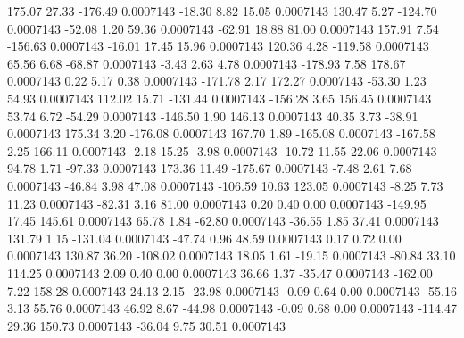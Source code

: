       175.07       27.33     -176.49     0.0007143
      -18.30        8.82       15.05     0.0007143
      130.47        5.27     -124.70     0.0007143
      -52.08        1.20       59.36     0.0007143
      -62.91       18.88       81.00     0.0007143
      157.91        7.54     -156.63     0.0007143
      -16.01       17.45       15.96     0.0007143
      120.36        4.28     -119.58     0.0007143
       65.56        6.68      -68.87     0.0007143
       -3.43        2.63        4.78     0.0007143
     -178.93        7.58      178.67     0.0007143
        0.22        5.17        0.38     0.0007143
     -171.78        2.17      172.27     0.0007143
      -53.30        1.23       54.93     0.0007143
      112.02       15.71     -131.44     0.0007143
     -156.28        3.65      156.45     0.0007143
       53.74        6.72      -54.29     0.0007143
     -146.50        1.90      146.13     0.0007143
       40.35        3.73      -38.91     0.0007143
      175.34        3.20     -176.08     0.0007143
      167.70        1.89     -165.08     0.0007143
     -167.58        2.25      166.11     0.0007143
       -2.18       15.25       -3.98     0.0007143
      -10.72       11.55       22.06     0.0007143
       94.78        1.71      -97.33     0.0007143
      173.36       11.49     -175.67     0.0007143
       -7.48        2.61        7.68     0.0007143
      -46.84        3.98       47.08     0.0007143
     -106.59       10.63      123.05     0.0007143
       -8.25        7.73       11.23     0.0007143
      -82.31        3.16       81.00     0.0007143
        0.20        0.40        0.00     0.0007143
     -149.95       17.45      145.61     0.0007143
       65.78        1.84      -62.80     0.0007143
      -36.55        1.85       37.41     0.0007143
      131.79        1.15     -131.04     0.0007143
      -47.74        0.96       48.59     0.0007143
        0.17        0.72        0.00     0.0007143
      130.87       36.20     -108.02     0.0007143
       18.05        1.61      -19.15     0.0007143
      -80.84       33.10      114.25     0.0007143
        2.09        0.40        0.00     0.0007143
       36.66        1.37      -35.47     0.0007143
     -162.00        7.22      158.28     0.0007143
       24.13        2.15      -23.98     0.0007143
       -0.09        0.64        0.00     0.0007143
      -55.16        3.13       55.76     0.0007143
       46.92        8.67      -44.98     0.0007143
       -0.09        0.68        0.00     0.0007143
     -114.47       29.36      150.73     0.0007143
      -36.04        9.75       30.51     0.0007143
